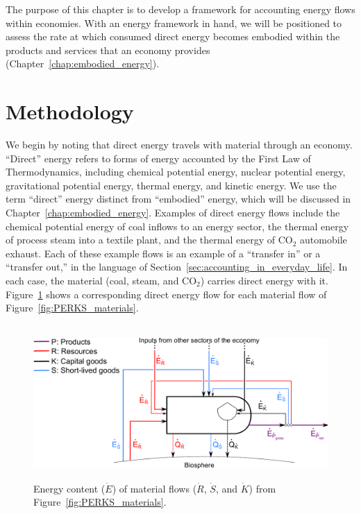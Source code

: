 The purpose of this chapter is to develop 
a framework for accounting energy flows within economies.
With an energy framework in hand, we will be positioned 
to assess the rate at which
consumed direct energy becomes embodied within the products and 
services that an economy provides
(Chapter~\ref{chap:embodied_energy}).


\section{Methodology}
\label{sec:energy_methodology}

We begin by noting that direct energy travels 
with material through an economy.
``Direct'' energy refers to forms of energy accounted by the 
First Law of Thermodynamics,
including chemical potential energy, 
nuclear potential energy, 
gravitational potential energy,
thermal energy, 
and kinetic energy.
We use the term ``direct'' energy distinct from ``embodied'' energy, 
which will be discussed in Chapter~\ref{chap:embodied_energy}.
Examples of direct energy flows include 
the chemical potential energy of coal inflows to an energy sector, 
the thermal energy of process steam into a textile plant, and
the thermal energy of CO$_2$ automobile exhaust.
Each of these example flows is an example of a ``transfer in''
or a ``transfer out,'' in the language %
of Section~\ref{sec:accounting_in_everyday_life}.
In each case, the material (coal, steam, and CO$_2$) 
carries direct energy with it.
Figure~\ref{fig:PERKS_energy_content} shows a corresponding 
direct energy flow for each material flow of Figure~\ref{fig:PERKS_materials}.

\begin{figure}[!ht]
\centering\
\includegraphics[width=0.8\linewidth]{Part_1/Chapter_Energy/images/PERKS_basic_unit_energy_content.pdf}
\caption[Energy content of material flows for a single sector]{Energy content ($\dot{E}$) of material flows 
($\dot{R}$, $\dot{S}$, and $\dot{K}$) 
from Figure~\ref{fig:PERKS_materials}.}
\label{fig:PERKS_energy_content}
\end{figure}

